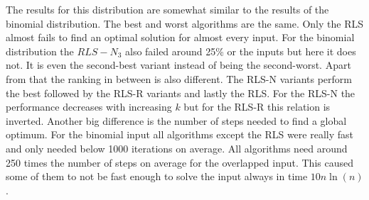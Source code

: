 The results for this distribution are somewhat similar to the results of the binomial distribution.
The best and worst algorithms are the same.
Only the RLS almost fails to find an optimal solution for almost every input.
For the binomial distribution the $RLS-N_3$ also failed around 25\% or the inputs but here it does not.
It is even the second-best variant instead of being the second-worst.
Apart from that the ranking in between is also different.
The RLS-N variants perform the best followed by the RLS-R variants and lastly the RLS.
For the RLS-N the performance decreases with increasing $k$ but for the RLS-R this relation is inverted.
Another big difference is the number of steps needed to find a global optimum.
For the binomial input all algorithms except the RLS were really fast and only needed below 1000 iterations on average.
All algorithms need around 250 times the number of steps on average for the overlapped input.
This caused some of them to not be fast enough to solve the input always in time $10n\ln(n)$.